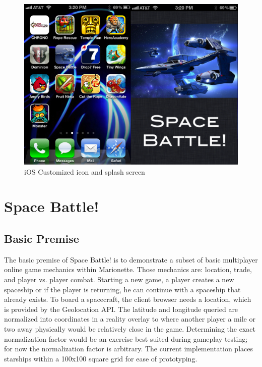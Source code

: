 \documentclass[12pt]{report}	%
\theoremstyle{definition}
\theoremstyle{remark}
\begin{document}
\begin{figure}[h!]
\centering
\includegraphics[scale=0.35]{2.png}
\caption{iOS Customized icon and splash screen}
\label{ioscustom}
\end{figure}

\chapter{Space Battle!}

\section{Basic Premise}

The basic premise of Space Battle! is to demonstrate a subset of basic
multiplayer online game mechanics within Marionette. Those mechanics
are: location, trade, and player vs. player combat. Starting a new game,
a player creates a new spaceship or if the player is returning, he can continue with a
spaceship that already exists. To board a spacecraft, the client
browser needs a location, which is provided by the Geolocation API. The
latitude and longitude queried are normalized into coordinates in a
reality overlay to where another player a mile or two away physically
would be relatively close in the game. Determining the exact
normalization factor would be an exercise best suited during gameplay
testing; for now the normalization factor is arbitrary.
The current implementation places starships within a 100x100 square grid
for ease of prototyping.
\end{document}
